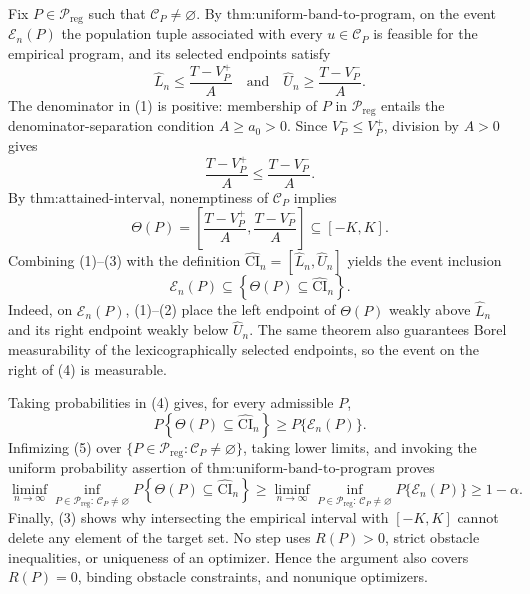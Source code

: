 Fix \(P\in\mathcal P_{\mathrm{reg}}\) such that \(\mathcal C_P\neq\varnothing\).  By \(\text{thm:uniform-band-to-program}\), on the event \(\mathcal E_n(P)\) the population tuple associated with every \(u\in\mathcal C_P\) is feasible for the empirical program, and its selected endpoints satisfy
\[
 \widehat L_n\leq \frac{T-V_P^+}{A}
 \quad\text{and}\quad
 \widehat U_n\geq \frac{T-V_P^-}{A}.
\tag{1}
\]
The denominator in (1) is positive: membership of \(P\) in \(\mathcal P_{\mathrm{reg}}\) entails the denominator-separation condition \(A\geq a_0>0\).  Since \(V_P^-\leq V_P^+\), division by \(A>0\) gives
\[
 \frac{T-V_P^+}{A}\leq \frac{T-V_P^-}{A}.
\tag{2}
\]
By \(\text{thm:attained-interval}\), nonemptiness of \(\mathcal C_P\) implies
\[
 \Theta(P)=\left[\frac{T-V_P^+}{A},\frac{T-V_P^-}{A}\right]
 \subseteq[-K,K].
\tag{3}
\]
Combining (1)--(3) with the definition
\(\widehat{\mathrm{CI}}_n=[\widehat L_n,\widehat U_n]\) yields the event inclusion
\[
 \mathcal E_n(P)
 \subseteq
 \left\{\Theta(P)\subseteq\widehat{\mathrm{CI}}_n\right\}.
\tag{4}
\]
Indeed, on \(\mathcal E_n(P)\), (1)--(2) place the left endpoint of \(\Theta(P)\) weakly above \(\widehat L_n\) and its right endpoint weakly below \(\widehat U_n\).  The same theorem also guarantees Borel measurability of the lexicographically selected endpoints, so the event on the right of (4) is measurable.

Taking probabilities in (4) gives, for every admissible \(P\),
\[
 P\!\left\{\Theta(P)\subseteq\widehat{\mathrm{CI}}_n\right\}
 \geq P\{\mathcal E_n(P)\}.
\tag{5}
\]
Infimizing (5) over
\(\{P\in\mathcal P_{\mathrm{reg}}:\mathcal C_P\neq\varnothing\}\), taking lower limits, and invoking the uniform probability assertion of \(\text{thm:uniform-band-to-program}\) proves
\[
 \liminf_{n\to\infty}
 \inf_{P\in\mathcal P_{\mathrm{reg}}:\,\mathcal C_P\neq\varnothing}
 P\!\left\{\Theta(P)\subseteq\widehat{\mathrm{CI}}_n\right\}
 \geq
 \liminf_{n\to\infty}
 \inf_{P\in\mathcal P_{\mathrm{reg}}:\,\mathcal C_P\neq\varnothing}
 P\{\mathcal E_n(P)\}
 \geq 1-\alpha.
\]
Finally, (3) shows why intersecting the empirical interval with \([-K,K]\) cannot delete any element of the target set.  No step uses \(R(P)>0\), strict obstacle inequalities, or uniqueness of an optimizer.  Hence the argument also covers \(R(P)=0\), binding obstacle constraints, and nonunique optimizers.
